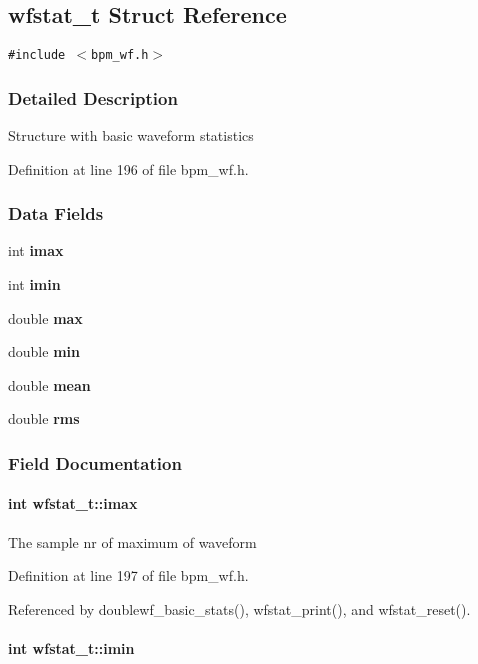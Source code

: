 \subsection{wfstat\_\-t Struct Reference}
\label{structwfstat__t}
{\tt \#include $<$bpm\_\-wf.h$>$}



\subsubsection{Detailed Description}
Structure with basic waveform statistics 

Definition at line 196 of file bpm\_\-wf.h.\subsubsection*{Data Fields}
\begin{CompactItemize}
\item 
int {\bf imax}
\item 
int {\bf imin}
\item 
double {\bf max}
\item 
double {\bf min}
\item 
double {\bf mean}
\item 
double {\bf rms}
\end{CompactItemize}


\subsubsection{Field Documentation}
\paragraph[imax]{\setlength{\rightskip}{0pt plus 5cm}int {\bf wfstat\_\-t::imax}}\hfill\label{structwfstat__t_f1cdafb6b6193cb959ac93199ee0c89a}


The sample nr of maximum of waveform 

Definition at line 197 of file bpm\_\-wf.h.

Referenced by doublewf\_\-basic\_\-stats(), wfstat\_\-print(), and wfstat\_\-reset().
\paragraph[imin]{\setlength{\rightskip}{0pt plus 5cm}int {\bf wfstat\_\-t::imin}}\hfill\label{structwfstat__t_a52ebc437733260e378a2fa227c71a6d}


